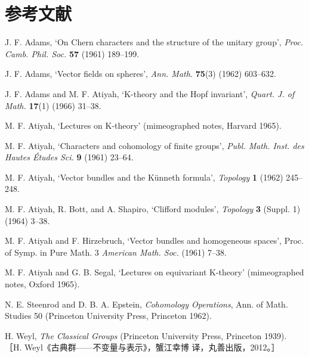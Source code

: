 \section*{参考文献}

\begin{enumerate}[label={[\arabic*]},leftmargin=3.0em,itemsep=1pt,topsep=2pt]
  \item J. F. Adams, `On Chern characters and the structure of the unitary group', \textit{Proc. Camb. Phil. Soc.} \textbf{57} (1961) 189--199.
  \item J. F. Adams, `Vector fields on spheres', \textit{Ann. Math.} \textbf{75}(3) (1962) 603--632.
  \item J. F. Adams and M. F. Atiyah, `K-theory and the Hopf invariant', \textit{Quart. J. of Math.} \textbf{17}(1) (1966) 31--38.
  \item M. F. Atiyah, `Lectures on K-theory' (mimeographed notes, Harvard 1965).
  \item M. F. Atiyah, `Characters and cohomology of finite groups', \textit{Publ. Math. Inst. des Hautes Études Sci.} \textbf{9} (1961) 23--64.
  \item M. F. Atiyah, `Vector bundles and the Künneth formula', \textit{Topology} \textbf{1} (1962) 245--248.
  \item M. F. Atiyah, R. Bott, and A. Shapiro, `Clifford modules', \textit{Topology} \textbf{3} (Suppl. 1) (1964) 3--38.
  \item M. F. Atiyah and F. Hirzebruch, `Vector bundles and homogeneous spaces', Proc. of Symp. in Pure Math. 3 \textit{American Math. Soc.} (1961) 7--38.
  \item M. F. Atiyah and G. B. Segal, `Lectures on equivariant K-theory' (mimeographed notes, Oxford 1965).
  \item N. E. Steenrod and D. B. A. Epstein, \textit{Cohomology Operations}, Ann. of Math. Studies 50 (Princeton University Press, Princeton 1962).
  \item H. Weyl, \textit{The Classical Groups} (Princeton University Press, Princeton 1939).\\
    ［H. Weyl《古典群——不变量与表示》，蟹江幸博 译，丸善出版，2012。］
\end{enumerate}

